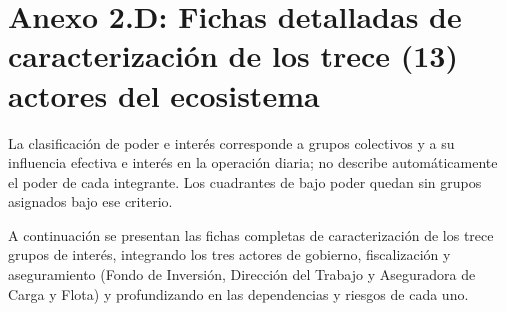 \section*{Anexo 2.D: Fichas detalladas de caracterización de los trece (13) actores del ecosistema}\label{sec:2-anexo-2d}

La clasificación de poder e interés corresponde a grupos colectivos y a su influencia efectiva e interés en la operación diaria; no describe automáticamente el poder de cada integrante. Los cuadrantes de bajo poder quedan sin grupos asignados bajo ese criterio.

A continuación se presentan las fichas completas de caracterización de los trece grupos de interés, integrando los tres actores de gobierno, fiscalización y aseguramiento (Fondo de Inversión, Dirección del Trabajo y Aseguradora de Carga y Flota) y profundizando en las dependencias y riesgos de cada uno.

